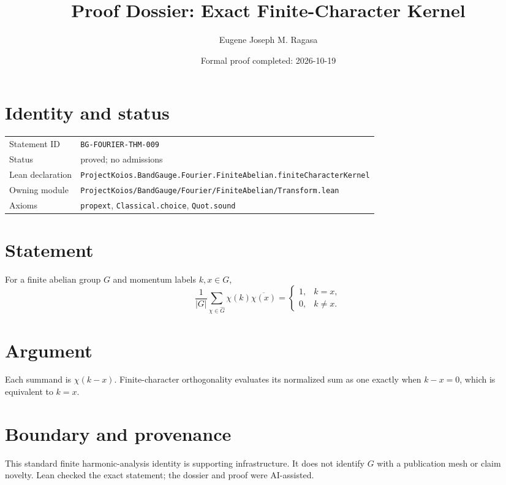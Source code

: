 \documentclass[11pt]{article}
\title{Proof Dossier: Exact Finite-Character Kernel}
\author{Eugene Joseph M. Ragasa}
\date{Formal proof completed: 2026-10-19}
\begin{document}
\maketitle
\section{Identity and status}
\begin{tabularx}{\textwidth}{@{}lX@{}}\toprule
Statement ID & \texttt{BG-FOURIER-THM-009} \\
Status & proved; no admissions \\
Lean declaration & \texttt{ProjectKoios.BandGauge.Fourier.FiniteAbelian.}\newline\texttt{finiteCharacterKernel} \\
Owning module & \texttt{ProjectKoios/BandGauge/Fourier/FiniteAbelian/Transform.lean} \\
Axioms & \texttt{propext}, \texttt{Classical.choice}, \texttt{Quot.sound} \\
\bottomrule\end{tabularx}
\section{Statement}
For a finite abelian group $G$ and momentum labels $k,x\in G$,
\[
 \frac{1}{|G|}\sum_{\chi\in\widehat G}\chi(k)\overline{\chi(x)}
 =\begin{cases}1,&k=x,\\0,&k\ne x.\end{cases}
\]
\section{Argument}
Each summand is $\chi(k-x)$. Finite-character orthogonality evaluates its normalized sum as one exactly when $k-x=0$, which is equivalent to $k=x$.
\section{Boundary and provenance}
This standard finite harmonic-analysis identity is supporting infrastructure. It does not identify $G$ with a publication mesh or claim novelty. Lean checked the exact statement; the dossier and proof were AI-assisted.
\end{document}
